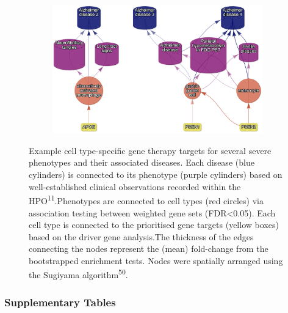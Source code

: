 \documentclass[
]{article}
\begin{document}
\begin{figure}
{\begin{figure}[H]
{}


\end{figure}%

\newpage{}

\begin{figure}[H]

{\centering \includegraphics{img/fig-therapy-examples-supp/alzheimer.png}

}


\end{figure}%

}

\caption{\label{fig-therapy-examples-supp}Example cell type-specific
gene therapy targets for several severe phenotypes and their associated
diseases. Each disease (blue cylinders) is connected to its phenotype
(purple cylinders) based on well-established clinical observations
recorded within the HPO\textsuperscript{11}.Phenotypes are connected to
cell types (red circles) via association testing between weighted gene
sets (FDR\textless0.05). Each cell type is connected to the prioritised
gene targets (yellow boxes) based on the driver gene analysis.The
thickness of the edges connecting the nodes represent the (mean)
fold-change from the bootstrapped enrichment tests. Nodes were spatially
arranged using the Sugiyama algorithm\textsuperscript{50}.}

\end{figure}%

\subsubsection{Supplementary Tables}\label{supplementary-tables}
\end{document}
